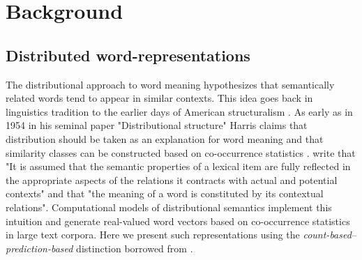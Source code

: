 \begin{comment}
Chapter~\ref{ch:COLI} introduces a recurrent and convolutional neural network
based model that learns from both visual-grounding signals and
word-word co-occurrences. We develop techniques to interpret the learned
representations of such an architecture and investigate if certain linguistic
phenomena is encoded in the learned model.

Chapter~\ref{ch:IJCNLP} provides empirical evidence that grounded learning
can improve machine translation quality.
In Chapter~\ref{ch:ConLL} we show under what conditions multilinguality an help improve grounded
representations.


\end{comment}

\chapter{Background}
\label{ch:background}

\section{Distributed word-representations}
\label{sec:words}
The distributional approach to word meaning hypothesizes that semantically related words
tend to appear in similar contexts. This idea goes back in linguistics tradition to the
earlier days of American structuralism \citep{nevin2002legacy}.
As early as in 1954 in his seminal paper "Distributional structure" Harris claims
that distribution should be taken as an explanation for word meaning and that similarity classes
can be constructed based on co-occurrence statistics \citep{harris1954distributional}.
\cite{cruse1986lexical} write that "It is  assumed  that  the  semantic properties  of
a lexical  item  are  fully  reflected  in  the  appropriate  aspects  of  the  relations
it  contracts  with  actual  and  potential  contexts" and that "the  meaning  of  a word
is constituted  by  its  contextual  relations". Computational models of distributional
semantics implement this intuition and generate real-valued word vectors based on co-occurrence
statistics in large text corpora. Here we present such representations using the \emph{count-based}--\emph{prediction-based} distinction borrowed from \cite{baroni2014don}.

